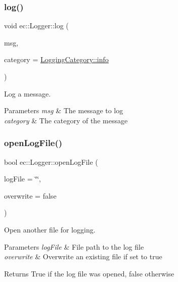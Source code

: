 \subsubsection{\texorpdfstring{log()}{log()}}
{\footnotesize\ttfamily void ec\+::\+Logger\+::log (\begin{DoxyParamCaption}\item[{const std\+::string \&}]{msg,  }\item[{\mbox{\hyperlink{namespaceec_a67e511e8b22e1051ea392cb2f68315d8}{Logging\+Category}}}]{category = {\ttfamily \mbox{\hyperlink{namespaceec_a67e511e8b22e1051ea392cb2f68315d8acaf9b6b99962bf5c2264824231d7a40c}{Logging\+Category\+::info}}} }\end{DoxyParamCaption})}



Log a message. 


\begin{DoxyParams}{Parameters}
{\em msg} & The message to log \\
\hline
{\em category} & The category of the message \\
\hline
\end{DoxyParams}
\mbox{\label{classec_1_1_logger_aaa61f62bc64a30b72c9a0c8cd8d61102}} 
\subsubsection{\texorpdfstring{open\+Log\+File()}{openLogFile()}}
{\footnotesize\ttfamily bool ec\+::\+Logger\+::open\+Log\+File (\begin{DoxyParamCaption}\item[{const std\+::string \&}]{log\+File = {\ttfamily \char`\"{}\char`\"{}},  }\item[{bool}]{overwrite = {\ttfamily false} }\end{DoxyParamCaption})}



Open another file for logging. 


\begin{DoxyParams}{Parameters}
{\em log\+File} & File path to the log file \\
\hline
{\em overwrite} & Overwrite an existing file if set to true \\
\hline
\end{DoxyParams}
\begin{DoxyReturn}{Returns}
True if the log file was opened, false otherwise 
\end{DoxyReturn}


